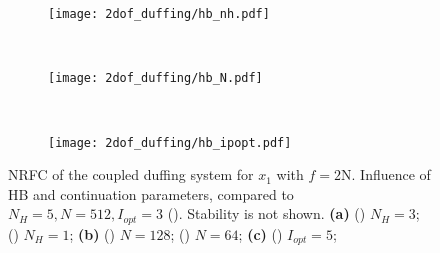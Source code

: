\begin{figure}[ht!]
  \centering
  \begin{subfigure}[b]{0.7\textwidth}
    \texttt{[image: 2dof\_duffing/hb\_nh.pdf]}
    \caption{}
    \label{fig:hb_frf_a_appendix}
  \end{subfigure}\\
  \begin{subfigure}[b]{0.45\textwidth}
    \texttt{[image: 2dof\_duffing/hb\_N.pdf]}
    \caption{}
    \label{fig:hb_frf_b_appendix}
  \end{subfigure}~
  \begin{subfigure}[b]{0.45\textwidth}
    \texttt{[image: 2dof\_duffing/hb\_ipopt.pdf]}
    \caption{}
    \label{fig:hb_frf_c_appendix}
  \end{subfigure}
  \caption{NRFC of the coupled duffing system for $x_1$ with $f=2$N. Influence
    of HB and continuation parameters, compared to $N_H=5, N=512, I_{opt}=3$ (\sampleline{}).
    Stability is not shown.
    \textbf{(a)}
    () $N_H=3$;
    () $N_H=1$;
    \textbf{(b)}
    () $N=128$;
    () $N=64$;
    \textbf{(c)}
    () $I_{opt}=5$;}
  \label{fig:hb_frf_appendix}
\end{figure}




